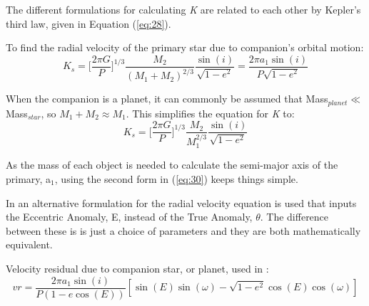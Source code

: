 \documentclass[12pt,preprint]{aastex}
\begin{document}
The different formulations for calculating {\it K} are related to each other by Kepler's third law, given in Equation (\ref{eq:28}).

To find the radial velocity of the primary star due to companion's orbital motion: %
\begin{equation}\label{eq:30}
K_s = \bigg[\frac{2\pi G}{P}\bigg]^{1/3}\frac{M_2}{(M_1+M_2)^{2/3}}\frac{\sin(i)}{\sqrt{1-e^2}} = \frac{2\pi a_1\sin(i)}{P\sqrt{1-e^2}}
\end{equation}

When the companion is a planet, it can commonly be assumed that Mass$_{planet} \ll$ Mass$_{star}$, so $M_1+M_2 \approx M_1$.  This simplifies the equation for {\it K} to:
\begin{equation}\label{eq:31}
K_s = \bigg[\frac{2\pi G}{P}\bigg]^{1/3}\frac{M_2}{M_1^{2/3}}\frac{\sin(i)}{\sqrt{1-e^2}}
\end{equation}

As the mass of each object is needed to calculate the semi-major axis of the primary, a$_1$, using the second form in (\ref{eq:30}) keeps things simple.



In \citet{Shulze-Hartung} an alternative formulation for the radial velocity equation is used that inputs the Eccentric Anomaly, E, instead of the True Anomaly, $\theta$.  The difference between these is is just a choice of parameters and they are both mathematically equivalent.

Velocity residual due to companion star, or planet, used in \citet{Shulze-Hartung}:
\begin{equation}\label{eq:32}
vr = \frac{2\pi a_1 \sin(i)}{P(1-e\cos(E))}[\sin(E)\sin(\omega)-\sqrt{1-e^2}\cos(E)\cos(\omega)]
\end{equation}
\end{document}
